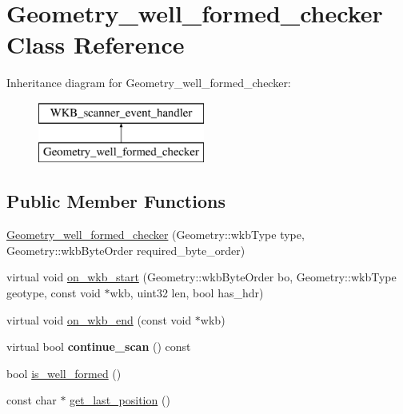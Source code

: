 \hypertarget{classGeometry__well__formed__checker}{}\section{Geometry\+\_\+well\+\_\+formed\+\_\+checker Class Reference}
\label{classGeometry__well__formed__checker}
Inheritance diagram for Geometry\+\_\+well\+\_\+formed\+\_\+checker\+:\begin{figure}[H]
\begin{center}
\leavevmode
\includegraphics[height=2.000000cm]{classGeometry__well__formed__checker}
\end{center}
\end{figure}
\subsection*{Public Member Functions}
\begin{DoxyCompactItemize}
\item 
\mbox{\hyperlink{classGeometry__well__formed__checker_a86ee1f6dba50f392ae11b34e6e37f6fe}{Geometry\+\_\+well\+\_\+formed\+\_\+checker}} (Geometry\+::wkb\+Type type, Geometry\+::wkb\+Byte\+Order required\+\_\+byte\+\_\+order)
\item 
virtual void \mbox{\hyperlink{classGeometry__well__formed__checker_a6ae74af00fe1297813f3c35ba58ff372}{on\+\_\+wkb\+\_\+start}} (Geometry\+::wkb\+Byte\+Order bo, Geometry\+::wkb\+Type geotype, const void $\ast$wkb, uint32 len, bool has\+\_\+hdr)
\item 
virtual void \mbox{\hyperlink{classGeometry__well__formed__checker_a448bf937ff032ce46a3b2e69a4d0907e}{on\+\_\+wkb\+\_\+end}} (const void $\ast$wkb)
\item 
\mbox{\label{classGeometry__well__formed__checker_a81864298854127b8fdd7b8bafda48703}} 
virtual bool {\bfseries continue\+\_\+scan} () const
\item 
bool \mbox{\hyperlink{classGeometry__well__formed__checker_aba31509fe61d86bb0caa954fdacad0e6}{is\+\_\+well\+\_\+formed}} ()
\item 
const char $\ast$ \mbox{\hyperlink{classGeometry__well__formed__checker_a16c82c0056e2db30c8305fe3d433d48f}{get\+\_\+last\+\_\+position}} ()
\end{DoxyCompactItemize}


